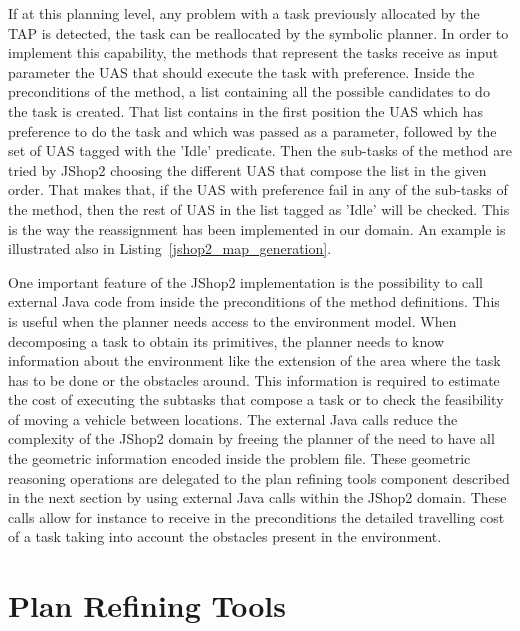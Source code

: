 \documentclass[twocolumn]{svjour3}          %
\begin{document}
If at this planning level, any problem with a task previously allocated by the TAP is detected, the task can be reallocated by the symbolic planner. In order to implement this capability, the methods that represent the tasks receive as input parameter the UAS that should execute the task with preference. Inside the preconditions of the method, a list containing all the possible candidates to do the task is created. That list contains in the first position the UAS which has preference to do the task and which was passed as a parameter, followed by the set of UAS tagged with the 'Idle' predicate. Then the sub-tasks of the method are tried by JShop2 choosing the different UAS that compose the list in the given order. That makes that, if the UAS with preference fail in any of the sub-tasks of the method, then the rest of UAS in the list tagged as 'Idle' will be checked. This is the way the reassignment has been implemented in our domain. An example is illustrated also in Listing~\ref{jshop2_map_generation}.



One important feature of the JShop2 implementation is the possibility to call external Java code from inside the preconditions of the method definitions. This is useful when the planner needs access to the environment model. When decomposing a task to obtain its primitives, the planner needs to know information about the environment like the extension of the area where the task has to be done or the obstacles around. This information is required to estimate the cost of executing the subtasks that compose a task or to check the feasibility of moving a vehicle between locations. The external Java calls reduce the complexity of the JShop2 domain by freeing the planner of the need to have all the geometric information encoded inside the problem file. These geometric reasoning operations are delegated to the plan refining tools component described in the next section by using external Java calls within the JShop2 domain. These calls allow for instance to receive in the preconditions the detailed travelling cost of a task taking into account the obstacles present in the environment.

\section{Plan Refining Tools}
\label{sec:prt}
\end{document}
